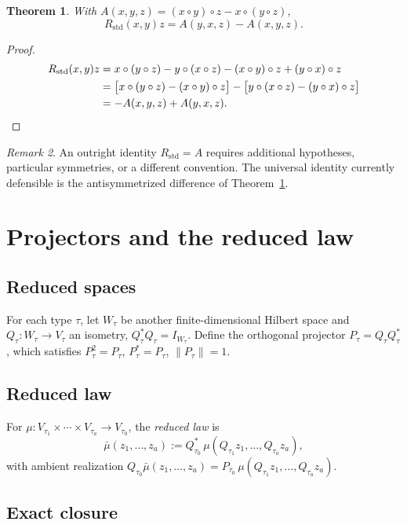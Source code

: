 \documentclass[11pt]{amsart}
\newtheorem{theorem}{Theorem}[section]
\theoremstyle{definition}
\theoremstyle{remark}
\newtheorem{remark}[theorem]{Remark}
\begin{document}
\begin{theorem}
\label{thm:curvature}
With $A(x,y,z) = (x\circ y)\circ z - x\circ(y\circ z)$,
\[
R_{\mathrm{std}}(x,y)z = A(y,x,z) - A(x,y,z).
\]
\end{theorem}
\begin{proof}
\begin{align*}
R_{\mathrm{std}}(x,y)z
&= x\circ(y\circ z) - y\circ(x\circ z) - (x\circ y)\circ z + (y\circ x)\circ z\\
&= \bigl[x\circ(y\circ z) - (x\circ y)\circ z\bigr]
 - \bigl[y\circ(x\circ z) - (y\circ x)\circ z\bigr]\\
&= -A(x,y,z) + A(y,x,z). \qedhere
\end{align*}
\end{proof}

\begin{remark}
An outright identity $R_{\mathrm{std}}=A$ requires additional
hypotheses, particular symmetries, or a different convention. The
universal identity currently defensible is the antisymmetrized
difference of Theorem~\ref{thm:curvature}.
\end{remark}

\section{Projectors and the reduced law}

\subsection{Reduced spaces}

For each type $\tau$, let $W_\tau$ be another finite-dimensional
Hilbert space and $Q_\tau : W_\tau \to V_\tau$ an isometry,
$Q_\tau^*Q_\tau = I_{W_\tau}$. Define the orthogonal projector
$P_\tau = Q_\tau Q_\tau^*$, which satisfies
$P_\tau^2=P_\tau$, $P_\tau^*=P_\tau$, $\lVert P_\tau\rVert=1$.

\subsection{Reduced law}

For $\mu : V_{\tau_1}\times\cdots\times V_{\tau_a}\to V_{\tau_0}$, the
\emph{reduced law} is
\[
\bar\mu(z_1,\ldots,z_a) := Q_{\tau_0}^{*}\,\mu(Q_{\tau_1}z_1,\ldots,Q_{\tau_a}z_a),
\]
with ambient realization
$Q_{\tau_0}\bar\mu(z_1,\ldots,z_a) = P_{\tau_0}\,\mu(Q_{\tau_1}z_1,\ldots,Q_{\tau_a}z_a)$.

\subsection{Exact closure}
\end{document}

